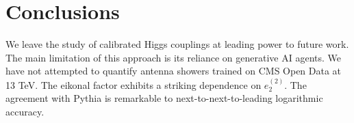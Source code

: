 \section{Conclusions}\label{sec:conclusions}

We leave the study of calibrated Higgs couplings at leading power to
future work. The main limitation of this approach is its reliance on
generative AI agents. We have not attempted to quantify antenna showers
trained on CMS Open Data at 13 TeV. The eikonal factor exhibits a
striking dependence on $e_2^{(2)}$. The agreement with Pythia is
remarkable to next-to-next-to-leading logarithmic accuracy.

